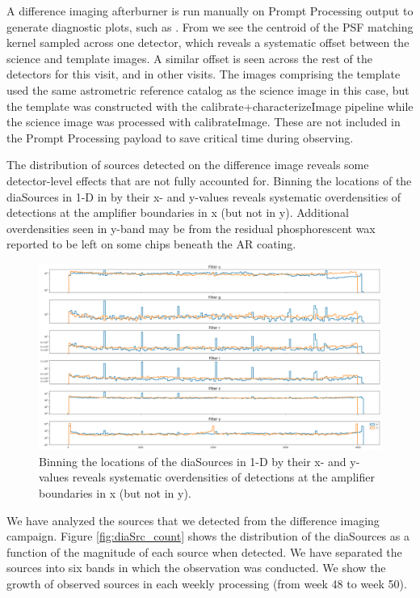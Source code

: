 A difference imaging afterburner is run manually on Prompt Processing output to generate diagnostic plots, such as .
From  we see the centroid of the PSF matching kernel sampled across one detector, which reveals a systematic offset between the science and template images.
A similar offset is seen across the rest of the detectors for this visit, and in other visits.
The images comprising the template used the same astrometric reference catalog as the science image in this case, but the template was constructed with the calibrate+characterizeImage pipeline while the science image was processed with calibrateImage.
These are not included in the Prompt Processing payload to save critical time during observing.

The distribution of sources detected on the difference image reveals some detector-level effects that are not fully accounted for.
Binning the locations of the diaSources in 1-D in  by their x- and y-values reveals systematic overdensities of detections at the amplifier boundaries in x (but not in y).
Additional overdensities seen in y-band may be from the residual phosphorescent wax reported to be left on some chips beneath the AR coating.

\begin{figure}
\includegraphics[width=\textwidth]{dia/figures/diaSource_distribution.png}
\caption{Binning the locations of the diaSources in 1-D by their x- and y-values reveals systematic overdensities of detections at the amplifier boundaries in x (but not in y). \label{fig:diaSource-distribution}}
\end{figure}

We have analyzed the sources that we detected from the difference imaging campaign. Figure \ref{fig:diaSrc_count} shows the distribution of the diaSources as a function of the magnitude of each source when detected. We have separated the sources into six bands in which the observation was conducted. We show the growth of observed sources in each weekly processing (from week 48 to week 50). 

